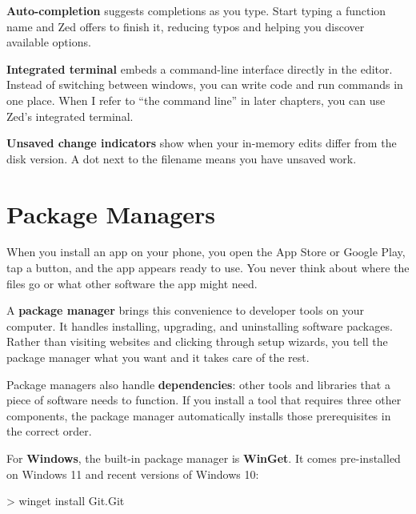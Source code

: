 \documentclass[
  letterpaper,
  DIV=11,
  numbers=noendperiod]{scrreprt}
\newenvironment{Shaded}{\begin{snugshade}}{\end{snugshade}}
\newcommand{\FunctionTok}[1]{\textcolor[rgb]{0.28,0.35,0.67}{#1}}
\newcommand{\NormalTok}[1]{\textcolor[rgb]{0.00,0.23,0.31}{#1}}
\newcommand{\OperatorTok}[1]{\textcolor[rgb]{0.37,0.37,0.37}{#1}}
\begin{document}
\textbf{Auto-completion} suggests completions as you type. Start typing
a function name and Zed offers to finish it, reducing typos and helping
you discover available options.

\textbf{Integrated terminal} embeds a command-line interface directly in
the editor. Instead of switching between windows, you can write code and
run commands in one place. When I refer to ``the command line'' in later
chapters, you can use Zed's integrated terminal.

\textbf{Unsaved change indicators} show when your in-memory edits differ
from the disk version. A dot next to the filename means you have unsaved
work.

\section{Package Managers}\label{package-managers}

When you install an app on your phone, you open the App Store or Google
Play, tap a button, and the app appears ready to use. You never think
about where the files go or what other software the app might need.

A \textbf{package manager} brings this convenience to developer tools on
your computer. It handles installing, upgrading, and uninstalling
software packages. Rather than visiting websites and clicking through
setup wizards, you tell the package manager what you want and it takes
care of the rest.

Package managers also handle \textbf{dependencies}: other tools and
libraries that a piece of software needs to function. If you install a
tool that requires three other components, the package manager
automatically installs those prerequisites in the correct order.

For \textbf{Windows}, the built-in package manager is \textbf{WinGet}.
It comes pre-installed on Windows 11 and recent versions of Windows 10:

\begin{codelisting}

\caption{\texttt{terminal (PowerShell)}}

\begin{Shaded}
\begin{Highlighting}[]
\OperatorTok{\textgreater{}}\NormalTok{ winget }\FunctionTok{install}\NormalTok{ Git.Git}
\end{Highlighting}
\end{Shaded}

\end{codelisting}
\end{document}
